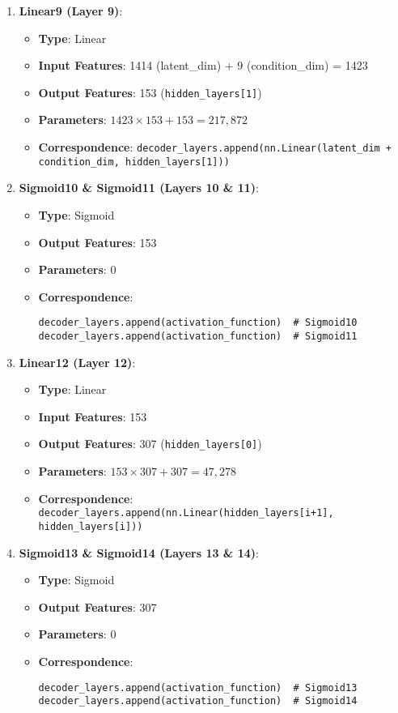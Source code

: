 \documentclass[10pt]{article}
\begin{document}
\begin{enumerate}
    \item \textbf{Linear9 (Layer 9)}:
    \begin{itemize}
        \item \textbf{Type}: Linear
        \item \textbf{Input Features}: 1414 (latent\_dim) + 9 (condition\_dim) = 1423
        \item \textbf{Output Features}: 153 (\texttt{hidden\_layers[1]})
        \item \textbf{Parameters}: \( 1423 \times 153 + 153 = 217,872 \)
        \item \textbf{Correspondence}: \texttt{decoder\_layers.append(nn.Linear(latent\_dim + condition\_dim, hidden\_layers[1]))}
    \end{itemize}
    
    \item \textbf{Sigmoid10 \& Sigmoid11 (Layers 10 \& 11)}:
    \begin{itemize}
        \item \textbf{Type}: Sigmoid
        \item \textbf{Output Features}: 153
        \item \textbf{Parameters}: 0
        \item \textbf{Correspondence}:
        \begin{verbatim}
decoder_layers.append(activation_function)  # Sigmoid10
decoder_layers.append(activation_function)  # Sigmoid11
        \end{verbatim}
    \end{itemize}
    
    \item \textbf{Linear12 (Layer 12)}:
    \begin{itemize}
        \item \textbf{Type}: Linear
        \item \textbf{Input Features}: 153
        \item \textbf{Output Features}: 307 (\texttt{hidden\_layers[0]})
        \item \textbf{Parameters}: \( 153 \times 307 + 307 = 47,278 \)
        \item \textbf{Correspondence}: \texttt{decoder\_layers.append(nn.Linear(hidden\_layers[i+1], hidden\_layers[i]))}
    \end{itemize}
    
    \item \textbf{Sigmoid13 \& Sigmoid14 (Layers 13 \& 14)}:
    \begin{itemize}
        \item \textbf{Type}: Sigmoid
        \item \textbf{Output Features}: 307
        \item \textbf{Parameters}: 0
        \item \textbf{Correspondence}:
        \begin{verbatim}
decoder_layers.append(activation_function)  # Sigmoid13
decoder_layers.append(activation_function)  # Sigmoid14
        \end{verbatim}
    \end{itemize}
    

\end{enumerate}
\end{document}
